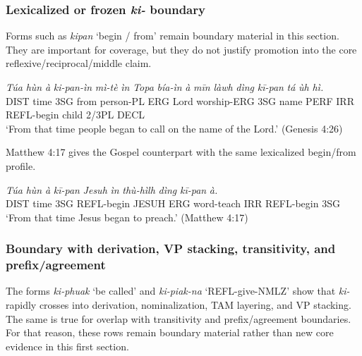 \documentclass[
  11pt,
  a4paper,
]{article}
\newcommand{\tdim}[1]{\textit{#1}}
\newcommand{\tdimword}[1]{\textit{#1}}
\renewcommand{\textsc}[1]{{\footnotesize\MakeUppercase{#1}}}
\newcommand{\glossquote}[1]{`#1'}
\begin{document}
\subsubsection{\texorpdfstring{Lexicalized or frozen \tdim{ki-}
boundary}{Lexicalized or frozen  boundary}}\label{lexicalized-or-frozen-boundary}

Forms such as \tdim{kipan} \glossquote{begin / from} remain boundary
material in this section. They are important for coverage, but they do
not justify promotion into the core reflexive/reciprocal/middle claim.

\begin{exe}
\ex \label{ex:ki-lex-kipan-gen4}
\gll \tdimword{Túa} \tdimword{hùn} \tdimword{à} \tdimword{ki-pan-ìn} \tdimword{mì-tè} \tdimword{ìn} \tdimword{Topa} \tdimword{bía-ìn} \tdimword{à} \tdimword{mīn} \tdimword{làwh} \tdimword{dìng} \tdimword{kī-pan} \tdimword{tá} \tdimword{ùh} \tdimword{hì.} \\
     \textsc{dist} time \textsc{3sg} from person-\textsc{pl} \textsc{erg} Lord worship-\textsc{erg} \textsc{3sg} name \textsc{perf} \textsc{irr} \textsc{refl}-begin child 2/3PL \textsc{decl} \\
\glt \glossquote{From that time people began to call on the name of the Lord.} (Genesis 4:26)
\end{exe}

Matthew 4:17 gives the Gospel counterpart with the same lexicalized
begin/from profile.

\begin{exe}
\ex \label{ex:ki-lex-kipan-matt4}
\gll \tdimword{Túa} \tdimword{hùn} \tdimword{à} \tdimword{kī-pan} \tdimword{Jesuh} \tdimword{ìn} \tdimword{thù-hìlh} \tdimword{dìng} \tdimword{kī-pan} \tdimword{à.} \\
     \textsc{dist} time \textsc{3sg} \textsc{refl}-begin \textsc{jesuh} \textsc{erg} word-teach \textsc{irr} \textsc{refl}-begin \textsc{3sg} \\
\glt \glossquote{From that time Jesus began to preach.} (Matthew 4:17)
\end{exe}

\subsubsection{Boundary with derivation, VP stacking, transitivity, and
prefix/agreement}\label{boundary-with-derivation-vp-stacking-transitivity-and-prefixagreement}

The forms \tdim{ki-phuak} \glossquote{be called} and \tdim{ki-piak-na}
\glossquote{REFL-give-NMLZ} show that \tdim{ki-} rapidly crosses into
derivation, nominalization, TAM layering, and VP stacking. The same is
true for overlap with transitivity and prefix/agreement boundaries. For
that reason, these rows remain boundary material rather than new core
evidence in this first section.
\end{document}
